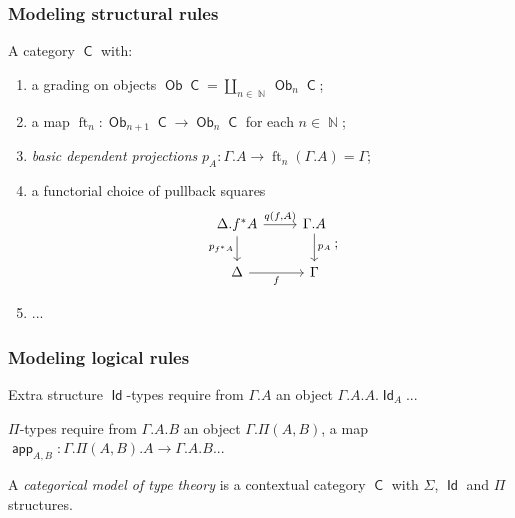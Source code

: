 \documentclass{beamer}
\DeclareMathOperator{\Id}{\mathsf{Id}}
\DeclareMathOperator{\sfC}{\mathsf{C}}
\DeclareMathOperator{\N}{\mathbb{N}}
\DeclareMathOperator{\Ob}{\mathsf{Ob}}
\DeclareMathOperator{\ft}{ft}
\DeclareMathOperator{\app}{\mathsf{app}}
\begin{document}
\begin{frame}
  \frametitle{Modeling structural rules}

  \begin{definition}
    A category $\sfC$ with:
    \begin{enumerate}
      \item a grading on objects $\Ob\sfC=\coprod_{n\in\N}\Ob_n\sfC$;
      \item a map $\ft_n\colon\Ob_{n+1}\sfC\rightarrow\Ob_n\sfC$ for each
        $n\in\N$;
      \item \emph{basic dependent projections}
        $p_A\colon\Gamma.A\rightarrow\ft_n(\Gamma.A)=\Gamma$;
      \item a functorial choice of pullback squares
        \[\begin{tikzcd}[ampersand replacement=\&]
          {\Delta.f^*A} \& {\Gamma.A} \\
          \Delta \& \Gamma
          \arrow["{p_A}", from=1-2, to=2-2]
          \arrow["{p_{f^*A}}"', from=1-1, to=2-1]
          \arrow["{q(f,A)}", from=1-1, to=1-2]
          \arrow["f"', from=2-1, to=2-2]
        \end{tikzcd};\]
      \item ...
    \end{enumerate}
  \end{definition}
\end{frame}

\begin{frame}
  \frametitle{Modeling logical rules}

  \begin{block}{Extra structure}
    $\Id$-types require from $\Gamma.A$ an object $\Gamma.A.A.\Id_A$...
    
    $\Pi$-types require from $\Gamma.A.B$ an object $\Gamma.\Pi(A,B)$, a map
    $\app_{A,B}\colon\Gamma.\Pi(A,B).A\rightarrow\Gamma.A.B$...
  \end{block}
  \pause

  \begin{defn}
    A \emph{categorical model of type theory} is a contextual category $\sfC$
    with $\Sigma$, $\Id$ and $\Pi$ structures.
  \end{defn}
\end{frame}
\end{document}
